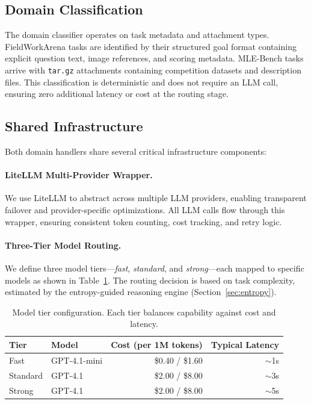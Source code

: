 \documentclass[11pt]{article}
\begin{document}
\subsection{Domain Classification}

The domain classifier operates on task metadata and attachment types. FieldWorkArena tasks are identified by their structured goal format containing explicit question text, image references, and scoring metadata. MLE-Bench tasks arrive with \texttt{tar.gz} attachments containing competition datasets and description files. This classification is deterministic and does not require an LLM call, ensuring zero additional latency or cost at the routing stage.

\subsection{Shared Infrastructure}

Both domain handlers share several critical infrastructure components:

\paragraph{LiteLLM Multi-Provider Wrapper.} We use LiteLLM \citep{litellm2024} to abstract across multiple LLM providers, enabling transparent failover and provider-specific optimizations. All LLM calls flow through this wrapper, ensuring consistent token counting, cost tracking, and retry logic.

\paragraph{Three-Tier Model Routing.} We define three model tiers---\emph{fast}, \emph{standard}, and \emph{strong}---each mapped to specific models as shown in Table~\ref{tab:model_tiers}. The routing decision is based on task complexity, estimated by the entropy-guided reasoning engine (Section~\ref{sec:entropy}).

\begin{table}[t]
\centering
\caption{Model tier configuration. Each tier balances capability against cost and latency.}
\label{tab:model_tiers}
\begin{tabular}{@{}llrr@{}}
\toprule
\textbf{Tier} & \textbf{Model} & \textbf{Cost (per 1M tokens)} & \textbf{Typical Latency} \\
\midrule
Fast     & GPT-4.1-mini   & \$0.40 / \$1.60  & $\sim$1s \\
Standard & GPT-4.1        & \$2.00 / \$8.00  & $\sim$3s \\
Strong   & GPT-4.1        & \$2.00 / \$8.00  & $\sim$5s \\
\bottomrule
\end{tabular}
\end{table}
\end{document}
